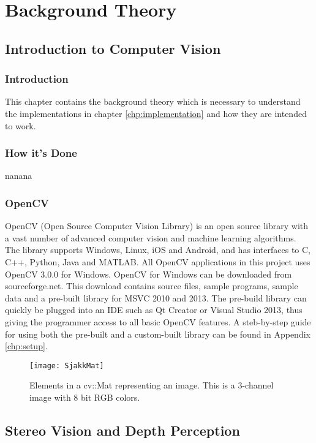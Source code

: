 \chapter{Background Theory}\label{chp:theory}

\section{Introduction to Computer Vision}

\subsection{Introduction}
This chapter contains the background theory which is necessary to understand the implementations in chapter \ref{chp:implementation} and how they are intended to work. 

\subsection{How it's Done}
nanana

\subsection{OpenCV}

OpenCV (Open Source Computer Vision Library) is an  open source library with a vast number of advanced computer vision and machine learning algorithms. The library supports Windows, Linux, iOS and Android, and has interfaces to C, C++, Python, Java and MATLAB. All OpenCV applications in this project uses OpenCV 3.0.0 for Windows. OpenCV for Windows can be downloaded from sourceforge.net. This download contains source files, sample programs, sample data and a pre-built library for MSVC 2010 and 2013. The pre-build library can quickly be plugged into  an IDE such as Qt Creator or Visual Studio 2013, thus giving the programmer access to all basic OpenCV features. A steb-by-step guide for using both the pre-built and a custom-built library can be found in Appendix \ref{chp:setup}.

\begin{figure}
\centering
\texttt{[image: SjakkMat]}
\caption{Elements in a cv::Mat representing an image. This is a 3-channel image with 8 bit RGB colors.}
\label{fig:matGrid}
\end{figure}

\section{Stereo Vision and Depth Perception}

